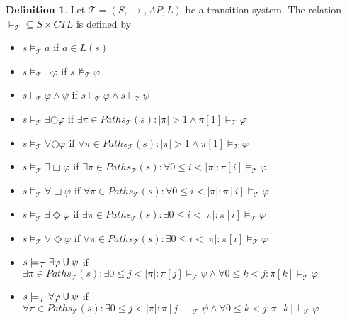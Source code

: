 \documentclass[12pt]{article}
\newcommand{\always}{\Box}
\newcommand{\eventually}{\Diamond}
\newcommand{\nxt}{\bigcirc}
\newcommand{\until}{\mathbin{\sf U}}
\theoremstyle{definition}
\newtheorem{definition}{Definition}
\begin{document}
\begin{definition}
Let $\mathcal{T} = (S, \rightarrow, \mathit{AP}, L)$ be a transition system.  The relation $\models_{\mathcal{T}} \subseteq S \times \mathit{CTL}$ is defined by
\begin{itemize}
\item
$s \models_{\mathcal{T}} a$ if $a \in L(s)$
\item
$s \models_{\mathcal{T}} \neg \varphi$ if $s \not\models_{\mathcal{T}} \varphi$
\item
$s \models_{\mathcal{T}} \varphi \wedge \psi$ if $s \models_{\mathcal{T}} \varphi \wedge s \models_{\mathcal{T}} \psi$
\item 
$s \models_{\mathcal{T}} \exists \nxt \varphi$ if $\exists \pi \in \mathit{Paths}_{\mathcal{T}}(s): |\pi| > 1 \wedge \pi[1] \models_{\mathcal{T}} \varphi$ 
\item 
$s \models_{\mathcal{T}} \forall \nxt \varphi$ if $\forall \pi \in \mathit{Paths}_{\mathcal{T}}(s): |\pi| > 1 \wedge \pi[1] \models_{\mathcal{T}} \varphi$
\item
$s \models_{\mathcal{T}} \exists \always \varphi$ if $\exists \pi \in \mathit{Paths}_{\mathcal{T}}(s) : \forall 0 \leq i < |\pi| : \pi[i] \models_{\mathcal{T}} \varphi$
\item
$s \models_{\mathcal{T}} \forall \always \varphi$ if $\forall \pi \in \mathit{Paths}_{\mathcal{T}}(s) : \forall 0 \leq i < |\pi| : \pi[i] \models_{\mathcal{T}} \varphi$
\item
$s \models_{\mathcal{T}} \exists \eventually \varphi$ if $\exists \pi \in \mathit{Paths}_{\mathcal{T}}(s) : \exists 0 \leq i < |\pi| : \pi[i] \models_{\mathcal{T}} \varphi$
\item
$s \models_{\mathcal{T}} \forall \eventually \varphi$ if $\forall \pi \in \mathit{Paths}_{\mathcal{T}}(s) : \exists 0 \leq i < |\pi| : \pi[i] \models_{\mathcal{T}} \varphi$
\item
$s \models_{\mathcal{T}} \exists \varphi \until \psi$ if $\exists \pi \in \mathit{Paths}_{\mathcal{T}}(s) : \exists 0 \leq j < |\pi| : \pi[j] \models_{\mathcal{T}} \psi \wedge \forall 0 \leq k < j : \pi[k] \models_{\mathcal{T}} \varphi$
\item
$s \models_{\mathcal{T}} \forall \varphi \until \psi$ if $\forall \pi \in \mathit{Paths}_{\mathcal{T}}(s) : \exists 0 \leq j < |\pi| : \pi[j] \models_{\mathcal{T}} \psi \wedge \forall 0 \leq k < j : \pi[k] \models_{\mathcal{T}} \varphi$
\end{itemize}
\end{definition}
\end{document}

